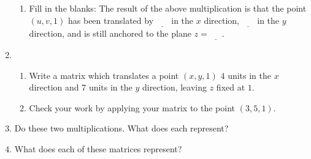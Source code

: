 \documentclass[../textbook.tex]{subfiles}
\begin{document}
\begin{enumerate}
\begin{enumerate}
\item Fill in the blanks: The result of the above multiplication is that the point $(u,v,1)$ has been translated by $\underline{\phantom{egg}}$ in the $x$ direction, $\underline{\phantom{egg}}$ in the $y$ direction, and is still anchored to the plane $z=\underline{\phantom{egg}}$.
\end{enumerate}
\item \begin{enumerate}
\item Write a matrix which translates a point $(x,y,1)$ $4$ units in the $x$ direction and $7$ units in the $y$ direction, leaving $z$ fixed at $1$.
\item Check your work by applying your matrix to the point $(3,5,1)$.
\end{enumerate}
\item Do these two multiplications. What does each represent?
\begin{enumerate}
\end{enumerate}
\item What does each of these matrices represent?
\begin{enumerate}
\end{enumerate}
\end{enumerate}
\end{document}
